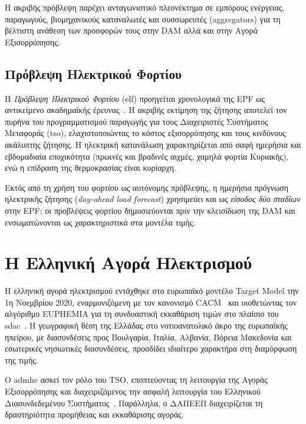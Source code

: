 Η ακριβής πρόβλεψη παρέχει ανταγωνιστικό πλεονέκτημα σε εμπόρους ενέργειας,
παραγωγούς, βιομηχανικούς καταναλωτές και συσσωρευτές (aggregators) για τη βέλτιστη
ανάθεση των προσφορών τους στην DAM αλλά και στην Αγορά Εξισορρόπησης.

\subsection*{Πρόβλεψη Ηλεκτρικού Φορτίου}

Η \textit{Πρόβλεψη Ηλεκτρικού Φορτίου} (\gls{elf}) προηγείται χρονολογικά της EPF
ως αντικείμενο ακαδημαϊκής έρευνας~\cite{hong2020}. Η ακριβής εκτίμηση της
ζήτησης αποτελεί τον πυρήνα του προγραμματισμού παραγωγής για τους Διαχειριστές
Συστήματος Μεταφοράς (\gls{tso}), ελαχιστοποιώντας το κόστος εξισορρόπησης και
τους κινδύνους ακάλυπτης ζήτησης. Η ηλεκτρική κατανάλωση χαρακτηρίζεται από
σαφή ημερήσια και εβδομαδιαία εποχικότητα (πρωινές και βραδινές αιχμές, χαμηλά
φορτία Κυριακής), ενώ η επίδραση της θερμοκρασίας είναι κυρίαρχη.

Εκτός από τη χρήση του φορτίου ως αυτόνομης πρόβλεψης, η ημερήσια πρόγνωση
ηλεκτρικής ζήτησης (\textit{day-ahead load forecast}) χρησιμεύει και ως \textit{είσοδος
δύο σταδίων} στην EPF: οι προβλέψεις φορτίου δημοσιεύονται πριν την κλεισίδωση
της DAM και ενσωματώνονται ως χαρακτηριστικά στα μοντέλα τιμής.


\section{Η Ελληνική Αγορά Ηλεκτρισμού}
\label{sec:greek_market}

Η ελληνική αγορά ηλεκτρισμού εντάχθηκε στο ευρωπαϊκό μοντέλο Target Model την
1η Νοεμβρίου 2020, εναρμονιζόμενη με τον κανονισμό CACM~\cite{cacm2015} και
υιοθετώντας τον αλγόριθμο EUPHEMIA για τη συνδυαστική εκκαθάριση τιμών στο
πλαίσιο του \gls{sdac}~\cite{nemo_sdac}. Η γεωγραφική θέση της Ελλάδας στο
νοτιοανατολικό άκρο της ευρωπαϊκής ηπείρου, με διασυνδέσεις προς Βουλγαρία,
Ιταλία, Αλβανία, Βόρεια Μακεδονία και εσωτερικές νησιωτικές διασυνδέσεις,
προσδίδει ιδιαίτερο χαρακτήρα στη διαμόρφωση της τιμής.

Ο \gls{admhe} ασκεί τον ρόλο του TSO, εποπτεύοντας τη λειτουργία της Αγοράς
Εξισορρόπησης και διαχειριζόμενος την ασφαλή λειτουργία του Ελληνικού
Διασυνδεδεμένου Συστήματος~\cite{ipto_balancing_market}. Παράλληλα, ο ΔΑΠΕΕΠ
διαχειρίζεται τη δραστηριότητα προμήθειας και εκκαθάρισης αγοράς.

